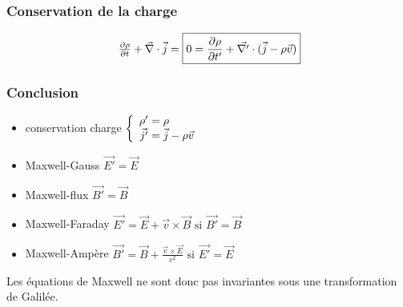 \subsubsection*{Conservation de la charge}
$$
	\begin{array}{r@{\;}l}
		\frac{\partial\rho}{\partial t}+\nab\cdot\vec{j}=\boxed{0=\frac{\partial\rho}{\partial t'}+\vec{\nabla '}\cdot(\vec{j}-\rho\vec{v})}
	\end{array}
$$

\subsubsection*{Conclusion}
\begin{itemize}
	\item {\renewcommand*{\arraystretch}{1.2} conservation charge $\left\{ \begin{array}{r@{\;}l}
					\rho '&=\rho\\
					\vec{j'}&=\vec{j}-\rho\vec{v}
			\end{array} \right.$}
	\item Maxwell-Gauss $\vec{E '}=\vec{E}$
	\item Maxwell-flux $\vec{B '}=\vec{B}$
	\item Maxwell-Faraday $\vec{E '}=\vec{E}+\vec{v}\times\vec{B} \text{ si } \vec{B'}=\vec{B}$
	\item Maxwell-Ampère $\vec{B '}=\vec{B}+\frac{\vec{v}\times\vec{E}}{c^2} \text{ si } \vec{E'}=\vec{E}$
\end{itemize}

Les équations de Maxwell ne sont donc pas invariantes sous une transformation de Galilée.

